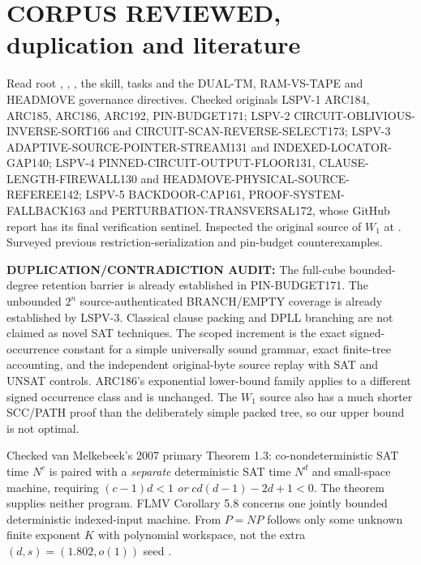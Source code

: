 \documentclass[11pt]{article}
\begin{document}
\section{CORPUS REVIEWED, duplication and literature}
Read root , , , the  skill, tasks and the DUAL-TM, RAM-VS-TAPE and HEADMOVE governance directives. Checked originals LSPV-1 ARC184, ARC185, ARC186, ARC192, PIN-BUDGET171; LSPV-2 CIRCUIT-OBLIVIOUS-INVERSE-SORT166 and CIRCUIT-SCAN-REVERSE-SELECT173; LSPV-3 ADAPTIVE-SOURCE-POINTER-STREAM131 and INDEXED-LOCATOR-GAP140; LSPV-4 PINNED-CIRCUIT-OUTPUT-FLOOR131, CLAUSE-LENGTH-FIREWALL130 and HEADMOVE-PHYSICAL-SOURCE-REFEREE142; LSPV-5 BACKDOOR-CAP161, PROOF-SYSTEM-FALLBACK163 and PERTURBATION-TRANSVERSAL172, whose GitHub report has its final verification sentinel. Inspected the original source of $W_1$ at . Surveyed previous restriction-serialization and pin-budget counterexamples.

\textbf{DUPLICATION/CONTRADICTION AUDIT:} The full-cube bounded-degree retention barrier is already established in PIN-BUDGET171. The unbounded $2^n$ source-authenticated BRANCH/EMPTY coverage is already established by LSPV-3. Classical clause packing and DPLL branching are not claimed as novel SAT techniques. The scoped increment is the exact signed-occurrence constant for a simple universally sound grammar, exact finite-tree accounting, and the independent original-byte source replay with SAT and UNSAT controls. ARC186's exponential lower-bound family applies to a different signed occurrence class and is unchanged. The $W_1$ source also has a much shorter SCC/PATH proof than the deliberately simple packed tree, so our upper bound is not optimal.

Checked van Melkebeek's 2007 primary Theorem 1.3: co-nondeterministic SAT time $N^c$ is paired with a \emph{separate} deterministic SAT time $N^d$ and small-space machine, requiring $(c-1)d<1$ \emph{or} $cd(d-1)-2d+1<0$. The theorem supplies neither program. FLMV Corollary 5.8 concerns one jointly bounded deterministic indexed-input machine. From $P=NP$ follows only some unknown finite exponent $K$ with polynomial workspace, not the extra $(d,s)=(1.802,o(1))$ seed \cite{vm,flmv}.
\end{document}
